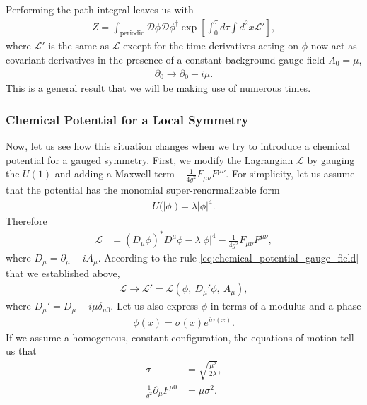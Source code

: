         Performing the path integral leaves us with
        \begin{align}
            Z= \int_{\text{periodic}} \mathcal{D}\phi \mathcal{D}\phi^{\dag} \exp \left[\int_0^{\tau} d\tau \int d^2x \mathcal{L'} \right],
        \end{align}
        where $\mathcal{L'}$ is the same as $\mathcal{L}$ except for the time derivatives acting on $\phi$ now act as covariant derivatives in the presence of a constant background gauge field $A_0=\mu$, \ie
        \begin{align}
            \partial_0 \rightarrow \partial_0 -i \mu. \label{eq:chemical_potential_gauge_field}
        \end{align}
        This is a general result that we will be making use of numerous times.
        \subsubsection{Chemical Potential for a Local Symmetry}
        Now, let us see how this situation changes when we try to introduce a chemical potential for a gauged symmetry. First, we modify the Lagrangian $\mathcal{L}$ by gauging the $U(1)$ and adding a Maxwell term $-\frac{1}{4 g^2} F_{\mu \nu} F^{\mu \nu}$. For simplicity, let us assume that the potential has the monomial super-renormalizable form
        \begin{align}
            U\big(|\phi| \big) = \lambda |\phi|^4.
        \end{align}
        Therefore
        \begin{align}
            \mathcal{L} &=( D_{\mu} \phi)^* D^{\mu} \phi - \lambda |\phi|^4 - \frac{1}{4 g^2}F_{\mu \nu} F^{\mu \nu},
        \end{align}
        where $D_{\mu}= \partial_{\mu} - i A_{\mu}$. According to the rule \ref{eq:chemical_potential_gauge_field} that we established above,
        \begin{align}
            \mathcal{L} \rightarrow \mathcal{L}'= \mathcal{L}\left(\phi,\ D_{\mu}' \phi,\ A_{\mu} \right),
        \end{align}
        where $D_{\mu}' = D_{\mu} - i \mu \delta_{\mu 0}$.
        Let us also express $\phi$ in terms of a modulus and a phase
        \begin{align}
            \phi(x) = \sigma(x) e^{i \alpha(x)}.
        \end{align}
        If we assume a homogenous, constant configuration, the equations of motion tell us that
        \begin{align}
            \sigma &= \sqrt{\frac{\mu^2}{2\lambda}}  \label{eq:chem_pot_local_symmetry_eom1}, \\
            \frac{1}{g^2} \partial_{\mu} F^{\mu 0} &= \mu \sigma^2. \label{eq:chem_pot_local_symmetry_eom2}
        \end{align}
